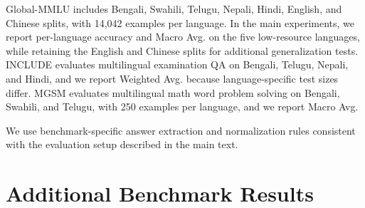 \documentclass[11pt]{article}
\begin{document}
Global-MMLU \citep{singh2025global} includes Bengali, Swahili, Telugu, Nepali, Hindi, English, and Chinese splits, with 14,042 examples per language.
In the main experiments, we report per-language accuracy and Macro Avg. on the five low-resource languages, while retaining the English and Chinese splits for additional generalization tests.
INCLUDE \citep{romanou2025include} evaluates multilingual examination QA on Bengali, Telugu, Nepali, and Hindi, and we report Weighted Avg. because language-specific test sizes differ.
MGSM \citep{shi2022language} evaluates multilingual math word problem solving on Bengali, Swahili, and Telugu, with 250 examples per language, and we report Macro Avg.

We use benchmark-specific answer extraction and normalization rules consistent with the evaluation setup described in the main text.

\section{Additional Benchmark Results}
\label{sec:app_additional_benchmark_results}
\end{document}
